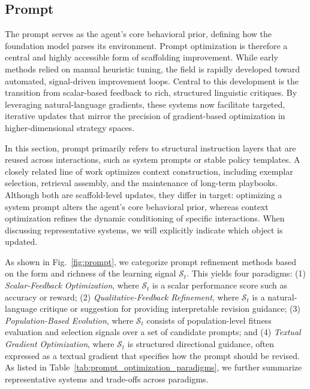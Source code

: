 \documentclass{article}
\begin{document}





\subsection{Prompt}
\label{sec:Prompt_Optimization}
The prompt serves as the agent's core behavioral prior, defining how the foundation model parses its environment. Prompt optimization is therefore a central and highly accessible form of scaffolding improvement. While early methods relied on manual heuristic tuning, the field is rapidly developed toward automated, signal-driven improvement loops. Central to this development is the transition from scalar-based feedback to rich, structured linguistic critiques. By leveraging natural-language gradients, these systems now facilitate targeted, iterative updates that mirror the precision of gradient-based optimization in higher-dimensional strategy spaces.

In this section, prompt primarily refers to structural instruction layers that are reused across interactions, such as system prompts or stable policy templates. A closely related line of work optimizes context construction, including exemplar selection, retrieval assembly, and the maintenance of long-term playbooks. Although both are scaffold-level updates, they differ in target: optimizing a system prompt alters the agent’s core behavioral prior, whereas context optimization refines the dynamic conditioning of specific interactions. When discussing representative systems, we will explicitly indicate which object is updated.

As shown in Fig.~\ref{fig:prompt}, we categorize prompt refinement methods based on the form and richness of the learning signal $\mathcal{S}_t$. This yields four paradigms: (1) \textit{Scalar-Feedback Optimization}, where $\mathcal{S}_t$ is a scalar performance score such as accuracy or reward;
(2) \textit{Qualitative-Feedback Refinement}, where $\mathcal{S}_t$ is a natural-language critique or suggestion for providing interpretable revision guidance;
(3) \textit{Population-Based Evolution}, where $\mathcal{S}_t$ consists of population-level fitness evaluation and selection signals over a set of candidate prompts;
and (4) \textit{Textual Gradient Optimization}, where $\mathcal{S}_t$ is structured directional guidance, often expressed as a textual gradient that specifies how the prompt should be revised. As listed in Table~\ref{tab:prompt_optimization_paradigms}, we further summarize representative systems and trade-offs across paradigms.
\end{document}
